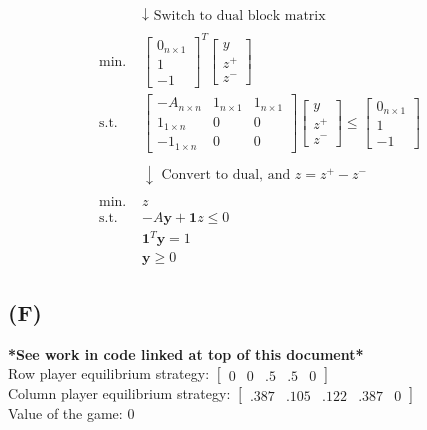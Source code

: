 \documentclass[12pt]{article}
\begin{document}
\begin{align*}
    & \downarrow \text{ Switch to dual block matrix} \\
    \\
    \text{min. } & \begin{bmatrix} 0_{n \times 1} \\ 1 \\ -1 \end{bmatrix}^T \begin{bmatrix} y \\ z^+ \\ z^- \end{bmatrix} \\
    \text{s.t. } & \begin{bmatrix} -A_{n \times n} & 1_{n \times 1} & 1_{n \times 1} \\ 1_{1 \times n} & 0 & 0 \\ -1_{1 \times n} & 0 & 0 \end{bmatrix} \begin{bmatrix} y \\ z^+ \\ z^- \end{bmatrix} \leq \begin{bmatrix} 0_{n \times 1} \\ 1 \\ -1 \end{bmatrix} \\
    \\
    &\downarrow \text{ Convert to dual, and $z=z^+ - z^-$}\\
    \\
    \text{min. } & z \\
    \text{s.t. } & -A\textbf{y} + \mathbf{1}z \leq 0 \\
    & \mathbf{1}^T \mathbf{y} = 1 \\
    & \mathbf{y} \geq 0
\end{align*}

\newpage
\subsection*{(F)}
\textbf{*See work in code linked at top of this document*} \\
Row player equilibrium strategy: $\begin{bmatrix} 0 & 0 & .5 & .5 & 0 \end{bmatrix}$ \\
Column player equilibrium strategy: $\begin{bmatrix} .387 & .105 & .122 & .387 & 0 \end{bmatrix}$ \\
Value of the game: 0
\end{document}
